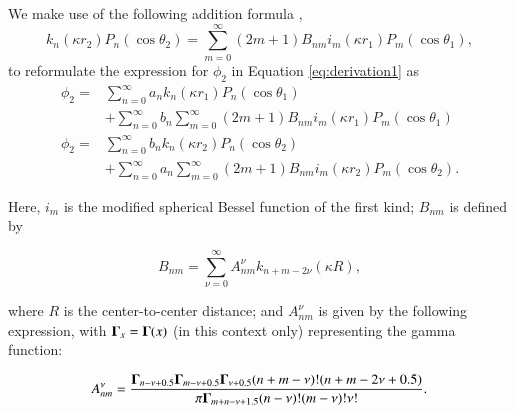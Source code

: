 We make use of the following addition formula \cite{MarceljaMitchellNinhamSculley1977},
%
\begin{equation} \label{eq:addition_formula}
k_n(\kappa r_2) P_n(\cos \theta_2) = \sum_{m=0}^{\infty}(2m+1) B_{nm} i_m(\kappa r_1) P_m(\cos \theta_1),
\end{equation}
%
\noindent to reformulate the expression for $\phi_2$ in Equation \eqref{eq:derivation1} as 
%
\begin{align} \label{eq:derivation2}
\phi_2 =& \sum_{n=0}^{\infty} a_n k_n(\kappa r_1) P_n(\cos \theta_1) \nonumber \\
& + \sum_{n=0}^{\infty} b_n \sum_{m=0}^{\infty}(2m+1) B_{nm} i_m(\kappa r_1) P_m(\cos \theta_1) \nonumber \\ 
\phi_2 =& \sum_{n=0}^{\infty} b_n k_n(\kappa r_2) P_n(\cos \theta_2) \nonumber \\
& + \sum_{n=0}^{\infty} a_n \sum_{m=0}^{\infty}(2m+1) B_{nm} i_m(\kappa r_2) P_m(\cos \theta_2).
\end{align}

Here, $i_m$ is the modified spherical Bessel function of the first kind; $B_{nm}$ is defined by 

\begin{equation} \label{eq:Bnm}
B_{nm} = \sum_{\nu=0}^{\infty} A_{nm}^{\nu} k_{n+m-2\nu}(\kappa R),
\end{equation}

\noindent where $R$ is the center-to-center distance; and $A_{nm}^{\nu}$ is given by the following expression, with ${\bf \Gamma}_x={\bf \Gamma}(x)$ (in this context only) representing the gamma function:

\begin{equation} \label{eq:Anm}
A_{nm}^{\nu} = \frac{{\bf \Gamma}_{n-\nu+0.5}{\bf \Gamma}_{m-\nu+0.5}{\bf \Gamma}_{\nu+0.5}(n+m-\nu)!(n+m-2\nu+0.5)}{\pi {\bf \Gamma}_{m+n-\nu+1.5}(n-\nu)!(m-\nu)!\nu!}.
\end{equation}



